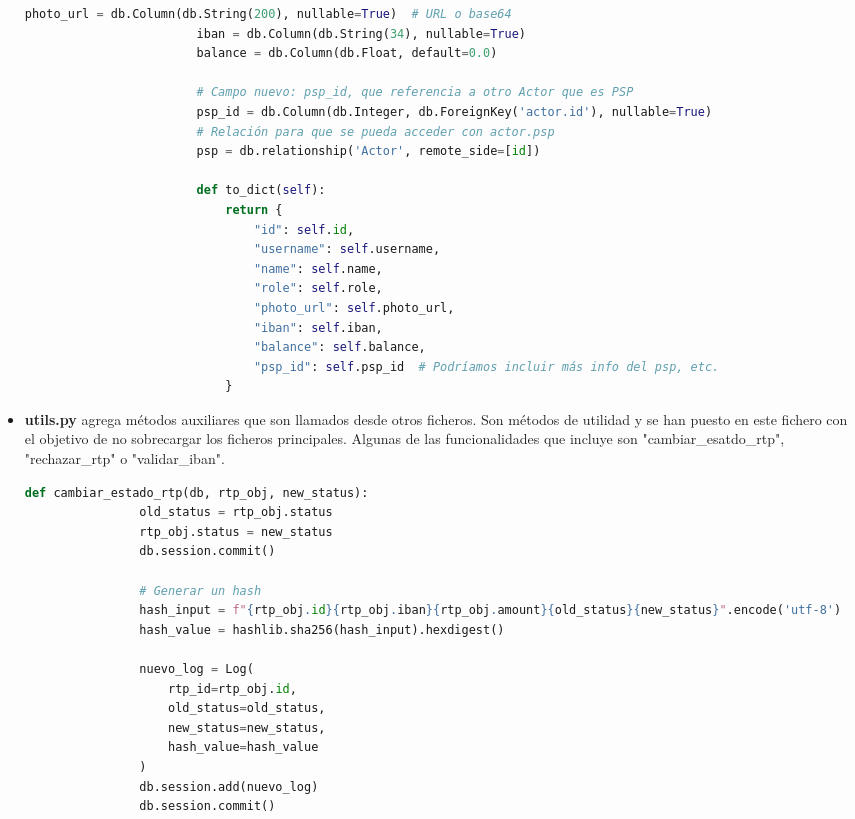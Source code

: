 \begin{itemize}
\begin{lstlisting}[language=Python, style=custom]
                        photo_url = db.Column(db.String(200), nullable=True)  # URL o base64
                        iban = db.Column(db.String(34), nullable=True)
                        balance = db.Column(db.Float, default=0.0)

                        # Campo nuevo: psp_id, que referencia a otro Actor que es PSP
                        psp_id = db.Column(db.Integer, db.ForeignKey('actor.id'), nullable=True)
                        # Relación para que se pueda acceder con actor.psp
                        psp = db.relationship('Actor', remote_side=[id])

                        def to_dict(self):
                            return {
                                "id": self.id,
                                "username": self.username,
                                "name": self.name,
                                "role": self.role,
                                "photo_url": self.photo_url,
                                "iban": self.iban,
                                "balance": self.balance,
                                "psp_id": self.psp_id  # Podríamos incluir más info del psp, etc.
                            }

                \end{lstlisting}

    \item \textbf{utils.py} agrega métodos auxiliares que son llamados desde otros ficheros. Son métodos de utilidad y se han puesto en este fichero con el objetivo de no sobrecargar los ficheros principales. Algunas de las funcionalidades que incluye son "cambiar_esatdo_rtp", "rechazar_rtp" o "validar_iban".

            \begin{lstlisting}[language=Python, style=custom]
                def cambiar_estado_rtp(db, rtp_obj, new_status):
                old_status = rtp_obj.status
                rtp_obj.status = new_status
                db.session.commit()

                # Generar un hash
                hash_input = f"{rtp_obj.id}{rtp_obj.iban}{rtp_obj.amount}{old_status}{new_status}".encode('utf-8')
                hash_value = hashlib.sha256(hash_input).hexdigest()

                nuevo_log = Log(
                    rtp_id=rtp_obj.id,
                    old_status=old_status,
                    new_status=new_status,
                    hash_value=hash_value
                )
                db.session.add(nuevo_log)
                db.session.commit()


\end{lstlisting}
\end{itemize}
